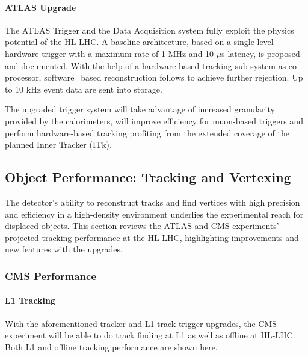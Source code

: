 \paragraph{ATLAS Upgrade}
The ATLAS Trigger and the Data Acquisition system  fully exploit the physics potential of the HL-LHC.
A baseline architecture, based on a single-level hardware trigger with a
maximum rate of 1 MHz and 10 $\mu$s latency, is proposed and documented. With
the help of a hardware-based tracking sub-system as co-processor, software=based
reconstruction follows to achieve further rejection. Up to 10 kHz event
data are sent into storage.

The upgraded trigger system will take advantage of increased granularity provided by the
calorimeters, will improve efficiency for muon-based triggers and perform hardware-based
tracking profiting from the extended coverage of the planned Inner Tracker (ITk). 



\subsection{Object Performance: Tracking and Vertexing} \label{sec:upgradeobject}

The detector's ability to reconstruct tracks and find vertices with high precision and efficiency in a high-density environment underlies the experimental reach for displaced objects. 
This section reviews the ATLAS and CMS experiments' projected tracking performance at the HL-LHC, highlighting improvements and new features with the upgrades.

\subsubsection{CMS Performance} 

\paragraph{L1 Tracking} 

With the aforementioned tracker and L1 track trigger upgrades, the CMS experiment will be able to do track finding at L1 as well as offline at HL-LHC. Both L1 and offline tracking performance are shown here. 

